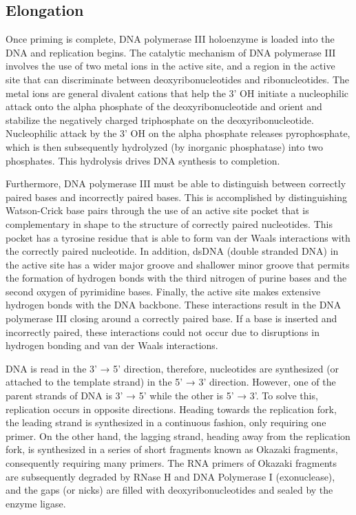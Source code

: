 \hypertarget{elongation-1}{%
\subsection{Elongation}\label{elongation-1}}

Once priming is complete, DNA polymerase III holoenzyme is loaded into the DNA and replication begins. The catalytic mechanism of DNA polymerase III involves the use of two metal ions in the active site, and a region in the active site that can discriminate between deoxyribonucleotides and ribonucleotides. The metal ions are general divalent cations that help the 3' OH initiate a nucleophilic attack onto the alpha phosphate of the deoxyribonucleotide and orient and stabilize the negatively charged triphosphate on the deoxyribonucleotide. Nucleophilic attack by the 3' OH on the alpha phosphate releases pyrophosphate, which is then subsequently hydrolyzed (by inorganic phosphatase) into two phosphates. This hydrolysis drives DNA synthesis to completion.

Furthermore, DNA polymerase III must be able to distinguish between correctly paired bases and incorrectly paired bases. This is accomplished by distinguishing Watson-Crick base pairs through the use of an active site pocket that is complementary in shape to the structure of correctly paired nucleotides. This pocket has a tyrosine residue that is able to form van der Waals interactions with the correctly paired nucleotide. In addition, dsDNA (double stranded DNA) in the active site has a wider major groove and shallower minor groove that permits the formation of hydrogen bonds with the third nitrogen of purine bases and the second oxygen of pyrimidine bases. Finally, the active site makes extensive hydrogen bonds with the DNA backbone. These interactions result in the DNA polymerase III closing around a correctly paired base. If a base is inserted and incorrectly paired, these interactions could not occur due to disruptions in hydrogen bonding and van der Waals interactions.

DNA is read in the 3' → 5' direction, therefore, nucleotides are synthesized (or attached to the template strand) in the 5' → 3' direction. However, one of the parent strands of DNA is 3' → 5' while the other is 5' → 3'. To solve this, replication occurs in opposite directions. Heading towards the replication fork, the leading strand is synthesized in a continuous fashion, only requiring one primer. On the other hand, the lagging strand, heading away from the replication fork, is synthesized in a series of short fragments known as Okazaki fragments, consequently requiring many primers. The RNA primers of Okazaki fragments are subsequently degraded by RNase H and DNA Polymerase I (exonuclease), and the gaps (or nicks) are filled with deoxyribonucleotides and sealed by the enzyme ligase.

